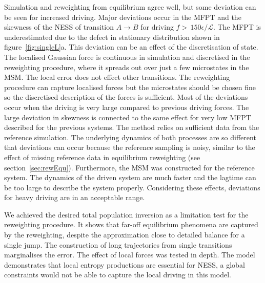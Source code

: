 Simulation and reweighting from equilibrium agree well, but some deviation can be seen for increased driving. Major deviations occur in the MFPT and the skewness of the NESS of transition $A \rightarrow B$ for driving $f >\,150 \epsilon / \mathcal{L}$. The MFPT is underestimated due to the defect in stationary distribution shown in figure~\ref{fig:singleL}a. This deviation can be an effect of the discretisation of state. The localised Gaussian force is continuous in simulation and discretised in the reweighting procedure, where it spreads out over just a few microstates in the MSM. The local error does not effect other transitions.  The reweighting procedure can capture localised forces but the microstates should be chosen fine so the discretised description of the forces is sufficient. Most of the deviations occur when the driving is very large compared to previous driving forces. The large deviation in skewness is connected to the same effect for very low MFPT described for the previous systems. The method relies on sufficient data from the reference simulation. The underlying dynamics of both processes are so different that deviations can occur because the reference sampling is noisy, similar to the effect of missing reference data in equilibrium reweighting (see section~\ref{sec:rewEqu}).  Furthermore, the MSM was constructed for the reference system. The dynamics of the driven system are much faster and the lagtime can be too large to describe the system properly.   Considering these effects, deviations for heavy driving are in an acceptable range. 


We achieved the desired total population inversion as a limitation test for the reweighting procedure. It shows that far-off equilibrium phenomena are captured by the reweighting, despite the approximation close to detailed balance for a single jump. The construction of long trajectories from single transitions marginalises the error.  The effect of local forces was tested in depth. The model demonstrates that local entropy productions are essential for NESS, a global constraints would not be able to capture the local driving in this model. 


